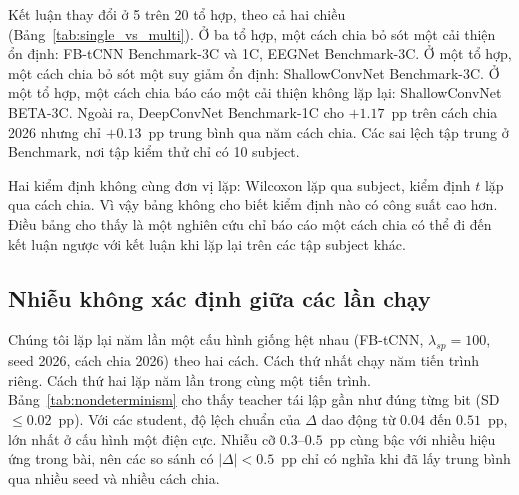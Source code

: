 \documentclass[10pt]{article} %
\begin{document}
Kết luận thay đổi ở 5 trên 20 tổ hợp, theo cả hai chiều (Bảng~\ref{tab:single_vs_multi}). Ở ba tổ hợp, một cách chia bỏ sót một cải thiện ổn định: FB-tCNN Benchmark-3C và 1C, EEGNet Benchmark-3C. Ở một tổ hợp, một cách chia bỏ sót một suy giảm ổn định: ShallowConvNet Benchmark-3C. Ở một tổ hợp, một cách chia báo cáo một cải thiện không lặp lại: ShallowConvNet BETA-3C. Ngoài ra, DeepConvNet Benchmark-1C cho $+1.17$~pp trên cách chia 2026 nhưng chỉ $+0.13$~pp trung bình qua năm cách chia. Các sai lệch tập trung ở Benchmark, nơi tập kiểm thử chỉ có 10 subject.

Hai kiểm định không cùng đơn vị lặp: Wilcoxon lặp qua subject, kiểm định $t$ lặp qua cách chia. Vì vậy bảng không cho biết kiểm định nào có công suất cao hơn. Điều bảng cho thấy là một nghiên cứu chỉ báo cáo một cách chia có thể đi đến kết luận ngược với kết luận khi lặp lại trên các tập subject khác.

\subsection{Nhiễu không xác định giữa các lần chạy}
\label{sec:nondeterminism}

Chúng tôi lặp lại năm lần một cấu hình giống hệt nhau (FB-tCNN, $\lambda_{sp}=100$, seed 2026, cách chia 2026) theo hai cách. Cách thứ nhất chạy năm tiến trình riêng. Cách thứ hai lặp năm lần trong cùng một tiến trình. Bảng~\ref{tab:nondeterminism} cho thấy teacher tái lập gần như đúng từng bit (SD $\le 0.02$~pp). Với các student, độ lệch chuẩn của $\Delta$ dao động từ $0.04$ đến $0.51$~pp, lớn nhất ở cấu hình một điện cực. Nhiễu cỡ $0.3$--$0.5$~pp cùng bậc với nhiều hiệu ứng trong bài, nên các so sánh có $\lvert\Delta\rvert < 0.5$~pp chỉ có nghĩa khi đã lấy trung bình qua nhiều seed và nhiều cách chia.
\end{document}
